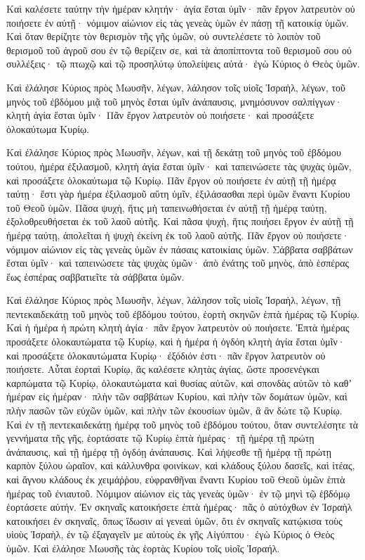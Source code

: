 {Καὶ καλέσετε ταύτην τὴν ἡμέραν κλητήν· ἁγία ἔσται ὑμῖν· πᾶν ἔργον λατρευτὸν οὐ ποιήσετε ἐν αὐτῇ· νόμιμον αἰώνιον εἰς τὰς γενεὰς ὑμῶν ἐν πάσῃ τῇ κατοικίᾳ ὑμῶν.
Καὶ ὅταν θερίζητε τὸν θερισμὸν τῆς γῆς ὑμῶν, οὐ συντελέσετε τὸ λοιπὸν τοῦ θερισμοῦ τοῦ ἀγροῦ σου ἐν τῷ θερίζειν σε, καὶ τὰ ἀποπίπτοντα τοῦ θερισμοῦ σου οὐ συλλέξεις· τῷ πτωχῷ καὶ τῷ προσηλύτῳ ὑπολείψεις αὐτά· ἐγὼ Κύριος ὁ Θεὸς ὑμῶν.
\par }{\PP {}Καὶ ἐλάλησε Κύριος πρὸς Μωυσῆν, λέγων,
λάλησον τοῖς υἱοῖς Ἰσραὴλ, λέγων, τοῦ μηνὸς τοῦ ἐβδόμου μιᾷ τοῦ μηνὸς ἔσται ὑμῖν ἀνάπαυσις, μνημόσυνον σαλπίγγων· κλητὴ ἁγία ἔσται ὑμῖν·
Πᾶν ἔργον λατρευτὸν οὐ ποιήσετε· καὶ προσάξετε ὁλοκαύτωμα Κυρίῳ.
\par }{\PP {}Καὶ ἐλάλησε Κύριος πρὸς Μωυσῆν, λέγων,
καὶ τῇ δεκάτῃ τοῦ μηνὸς τοῦ ἐβδόμου τούτου, ἡμέρα ἐξιλασμοῦ, κλητὴ ἁγία ἔσται ὑμῖν· καὶ ταπεινώσετε τὰς ψυχὰς ὑμῶν, καὶ προσάξετε ὁλοκαύτωμα τῷ Κυρίῳ.
Πᾶν ἔργον οὐ ποιήσετε ἐν αὐτῇ τῇ ἡμέρᾳ ταύτῃ· ἔστι γὰρ ἡμέρα ἐξιλασμοῦ αὕτη ὑμῖν, ἐξιλάσασθαι περὶ ὑμῶν ἔναντι Κυρίου τοῦ Θεοῦ ὑμῶν.
Πᾶσα ψυχὴ, ἥτις μὴ ταπεινωθήσεται ἐν αὐτῇ τῇ ἡμέρᾳ ταύτῃ, ἐξολοθρευθήσεται ἐκ τοῦ λαοῦ αὐτῆς.
Καὶ πᾶσα ψυχὴ, ἥτις ποιήσει ἔργον ἐν αὐτῇ τῇ ἡμέρᾳ ταύτῃ, ἀπολεῖται ἡ ψυχὴ ἐκείνη ἐκ τοῦ λαοῦ αὐτῆς.
Πᾶν ἔργον οὐ ποιήσετε· νόμιμον αἰώνιον εἰς τὰς γενεὰς ὑμῶν ἐν πάσαις κατοικίαις ὑμῶν.
Σάββατα σαββάτων ἔσται ὑμῖν· καὶ ταπεινώσετε τὰς ψυχὰς ὑμῶν· ἀπὸ ἐνάτης τοῦ μηνὸς, ἀπὸ ἑσπέρας ἕως ἑσπέρας σαββατιεῖτε τὰ σάββατα ὑμῶν.
\par }{\PP {}Καὶ ἐλάλησε Κύριος πρὸς Μωυσῆν, λέγων,
λάλησον τοῖς υἱοῖς Ἰσραὴλ, λέγων, τῇ πεντεκαιδεκάτῃ τοῦ μηνὸς τοῦ ἐβδόμου τούτου, ἑορτὴ σκηνῶν ἑπτὰ ἡμέρας τῷ Κυρίῳ.
Καὶ ἡ ἡμέρα ἡ πρώτη κλητὴ ἁγία· πᾶν ἔργον λατρευτὸν οὐ ποιήσετε.
Ἑπτὰ ἡμέρας προσάξετε ὁλοκαυτώματα τῷ Κυρίῳ, καὶ ἡ ἡμέρα ἡ ὀγδόη κλητὴ ἁγία ἔσται ὑμῖν· καὶ προσάξετε ὁλοκαυτώματα Κυρίῳ· ἐξόδιόν ἐστι· πᾶν ἔργον λατρευτὸν οὐ ποιήσετε.
Αὗται ἑορταὶ Κυρίῳ, ἃς καλέσετε κλητὰς ἁγίας, ὥστε προσενέγκαι καρπώματα τῷ Κυρίῳ, ὁλοκαυτώματα καὶ θυσίας αὐτῶν, καὶ σπονδὰς αὐτῶν τὸ καθʼ ἡμέραν εἰς ἡμέραν·
πλὴν τῶν σαββάτων Κυρίου, καὶ πλὴν τῶν δομάτων ὑμῶν, καὶ πλὴν πασῶν τῶν εὐχῶν ὑμῶν, καὶ πλὴν τῶν ἐκουσίων ὑμῶν, ἃ ἂν δώτε τῷ Κυρίῳ.
Καὶ ἐν τῇ πεντεκαιδεκάτῃ ἡμέρᾳ τοῦ μηνὸς τοῦ ἑβδόμου τούτου, ὅταν συντελέσητε τὰ γεννήματα τῆς γῆς, ἑορτάσατε τῷ Κυρίῳ ἑπτὰ ἡμέρας· τῇ ἡμέρᾳ τῇ πρώτῃ ἀνάπαυσις, καὶ τῇ ἡμέρᾳ τῇ ὀγδόῃ ἀνάπαυσις.
Καὶ λήψεσθε τῇ ἡμέρᾳ τῇ πρώτῃ καρπὸν ξύλου ὡραῖον, καὶ κάλλυνθρα φοινίκων, καὶ κλάδους ξύλου δασεῖς, καὶ ἰτέας, καὶ ἄγνου κλάδους ἐκ χειμάῤῥου, εὐφρανθῆναι ἔναντι Κυρίου τοῦ Θεοῦ ὑμῶν ἑπτὰ ἡμέρας τοῦ ἐνιαυτοῦ.
Νόμιμον αἰώνιον εἰς τὰς γενεὰς ὑμῶν· ἐν τῷ μηνὶ τῷ ἑβδόμῳ ἑορτάσετε αὐτήν.
Ἐν σκηναῖς κατοικήσετε ἑπτὰ ἡμέρας· πᾶς ὁ αὐτόχθων ἐν Ἰσραὴλ κατοικήσει ἐν σκηναῖς,
ὅπως ἴδωσιν αἱ γενεαὶ ὑμῶν, ὅτι ἐν σκηναῖς κατῴκισα τοὺς υἱοὺς Ἰσραὴλ, ἐν τῷ ἐξαγαγεῖν με αὐτοὺς ἐκ γῆς Αἰγύπτου· ἐγὼ Κύριος ὁ Θεὸς ὑμῶν.
Καὶ ἐλάλησε Μωυσῆς τὰς ἑορτὰς Κυρίου τοῖς υἱοῖς Ἰσραήλ.

}

